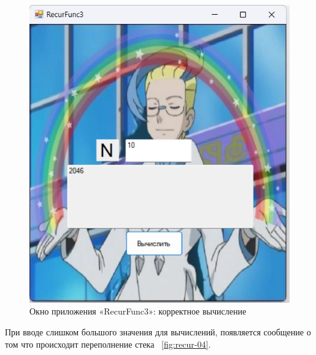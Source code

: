 \documentclass[bachelor, och, pract, times]{SCWorks}
\begin{document}
\begin{figure}[H]
    \centering
    \includegraphics[scale=0.7]{Скрины/Снимок экрана 2025-01-03 221640.png}
    \caption{Окно приложения «RecurFunc3»: корректное вычисление}\label{fig:recur-03}
\end{figure}

При вводе слишком большого значения для вычислений, появляется сообщение о том что происходит переполнение стека ~\ref{fig:recur-04}.
\end{document}
